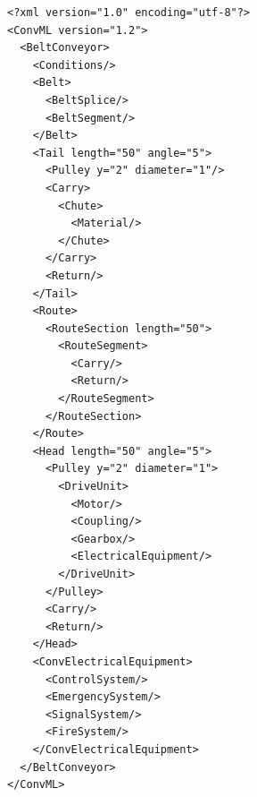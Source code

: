 \documentclass[12pt,a4paper]{article}
\begin{document}
\begin{verbatim}
<?xml version="1.0" encoding="utf-8"?>
<ConvML version="1.2">
  <BeltConveyor>
    <Conditions/>
    <Belt>
      <BeltSplice/>
      <BeltSegment/>
    </Belt>
    <Tail length="50" angle="5">
      <Pulley y="2" diameter="1"/>
      <Carry>
        <Chute>
          <Material/>
        </Chute>
      </Carry>
      <Return/>
    </Tail>
    <Route>
      <RouteSection length="50">
        <RouteSegment>
          <Carry/>
          <Return/>
        </RouteSegment>
      </RouteSection>
    </Route>
    <Head length="50" angle="5">
      <Pulley y="2" diameter="1">
        <DriveUnit>
          <Motor/>
          <Coupling/>
          <Gearbox/>
          <ElectricalEquipment/>
        </DriveUnit>
      </Pulley>
      <Carry/>
      <Return/>
    </Head>
    <ConvElectricalEquipment>
      <ControlSystem/>
      <EmergencySystem/>
      <SignalSystem/>
      <FireSystem/>
    </ConvElectricalEquipment>
  </BeltConveyor>
</ConvML>
\end{verbatim}



\end{document}
